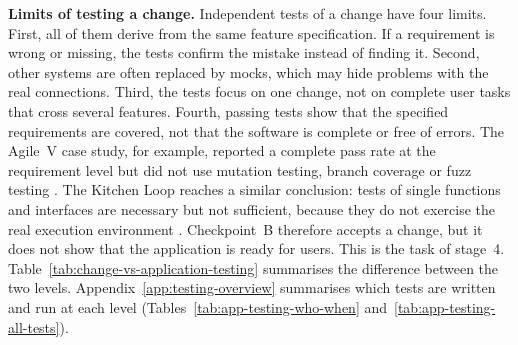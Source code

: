 \documentclass[10pt,a4paper]{article}
\begin{document}
\textbf{Limits of testing a change.} Independent tests of a change have four
limits. First, all of them derive from the same feature specification. If a
requirement is wrong or missing, the tests confirm the mistake instead of
finding it. Second, other systems are often replaced by mocks, which may hide
problems with the real connections. Third, the tests focus on one change, not
on complete user tasks that cross several features. Fourth, passing tests
show that the specified requirements are covered, not that the software is
complete or free of errors. The Agile~V case study, for example, reported a
complete pass rate at the requirement level but did not use mutation testing,
branch coverage or fuzz testing \parencite{koch2026agile}. The Kitchen Loop
reaches a similar conclusion: tests of single functions and interfaces are
necessary but not sufficient, because they do not exercise the real execution
environment \parencite{TODO-kitchenloop}. Checkpoint~B therefore accepts a
change, but it does not show that the application is ready for users. This is
the task of stage~4. Table~\ref{tab:change-vs-application-testing} summarises
the difference between the two levels. Appendix~\ref{app:testing-overview}
summarises which tests are written and run at each level
(Tables~\ref{tab:app-testing-who-when}
and~\ref{tab:app-testing-all-tests}).
\end{document}
